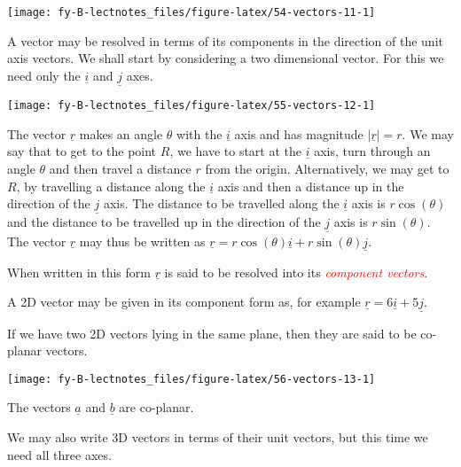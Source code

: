 \documentclass[
  11pt,
  oneside]{book}
\newcommand{\slide}{}
\theoremstyle{definition}
\theoremstyle{definition}
\theoremstyle{definition}
\theoremstyle{definition}
\theoremstyle{remark}
\begin{document}
\begin{center}\texttt{[image: fy-B-lectnotes\_files/figure-latex/54-vectors-11-1]} \end{center}

A vector may be resolved in terms of its components in the direction of the unit axis vectors. We shall start by considering a two dimensional vector. For this we need only the \(\underline i\) and \(\underline j\) axes.

\begin{center}\texttt{[image: fy-B-lectnotes\_files/figure-latex/55-vectors-12-1]} \end{center}

The vector \(\underline r\) makes an angle \(\theta\) with the \(\underline i\) axis and has magnitude \(|\underline r| = r\). We may say that to get to the point \(R\), we have to start at the \(\underline i\) axis, turn through an angle \(\theta\) and then travel a distance \(r\) from the origin. Alternatively, we may get to \(R\), by travelling a distance along the \(\underline i\) axis and then a distance up in the direction of the \(\underline j\) axis. The distance to be travelled along the \(\underline i\) axis is \(r\cos(\theta)\) and the distance to be travelled up in the direction of the \(\underline j\) axis is \(r\sin(\theta)\). The vector \(\underline r\) may thus be written as \(\underline r = r\cos(\theta) \underline i + r\sin(\theta)\underline j\).

When written in this form \(\underline r\) is said to be resolved into its \textcolor{red}{\em component vectors}.

\slide

A 2D vector may be given in its component form as, for example \(\underline r = 6\underline i + 5\underline j\).

If we have two 2D vectors lying in the same plane, then they are said to be co-planar vectors.

\begin{center}\texttt{[image: fy-B-lectnotes\_files/figure-latex/56-vectors-13-1]} \end{center}

The vectors \(\underline a\) and \(\underline b\) are co-planar.

\slide

We may also write 3D vectors in terms of their unit vectors, but this time we need all three axes.
\end{document}
